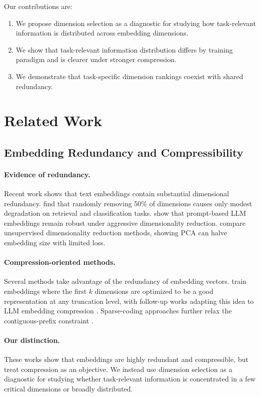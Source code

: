 \documentclass[11pt]{article}
\begin{document}
Our contributions are:
\begin{enumerate}
\item We propose dimension selection as a diagnostic for studying how task-relevant information is distributed across embedding dimensions.
\item We show that task-relevant information distribution differs by training paradigm and is clearer under stronger compression.
\item We demonstrate that task-specific dimension rankings coexist with shared redundancy.
\end{enumerate}

\section{Related Work}
\subsection{Embedding Redundancy and Compressibility}

\paragraph{Evidence of redundancy.}
Recent work shows that text embeddings contain substantial dimensional redundancy. \citet{takeshita2025randomly} find that randomly removing 50\% of dimensions causes only modest degradation on retrieval and classification tasks. \citet{tsukagoshi2025redundancy} show that prompt-based LLM embeddings remain robust under aggressive dimensionality reduction. \citet{zhang2024evaluating} compare unsupervised dimensionality reduction methods, showing PCA can halve embedding size with limited loss.

\paragraph{Compression-oriented methods.} 
Several methods take advantage of the redundancy of embedding vectors. \citet{matryoshka2023} train embeddings where the first $k$ dimensions are optimized to be a good representation at any truncation level, with follow-up works adapting this idea to LLM embedding compression \citep{matryoshka-adaptor, smec2025}. Sparse-coding approaches further relax the contiguous-prefix constraint \citep{beyond-matryoshka2025}. 

\paragraph{Our distinction.}
These works show that embeddings are highly redundant and compressible, but treat compression as an objective. We instead use dimension selection as a diagnostic for studying whether task-relevant information is concentrated in a few critical dimensions or broadly distributed.
\end{document}
